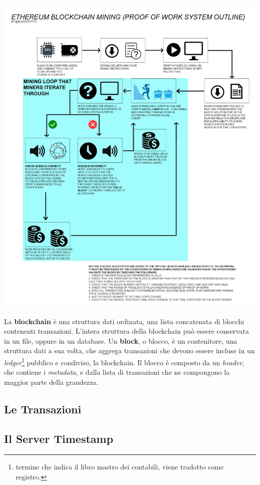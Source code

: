 \documentclass[12pt,a4paper,draft]{article}
\begin{document}
%
\begin{center}
    \includegraphics[width=\linewidth]{img/pow}
\end{center}
%
La \textbf{blockchain} è una struttura dati ordinata, una lista concatenata di blocchi contenenti transazioni.
L'intera struttura della blockchain può essere conservata in un file, oppure in un database.
Un \textbf{block}, o blocco, è un contenitore, una struttura dati a sua volta, che aggrega transazioni che devono essere incluse in un \textit{ledger}\footnote{termine che indica il libro mastro dei contabili, viene tradotto come registro.} pubblico e condiviso, la blockchain. 
Il blocco è composto da un \textit{header}, che contiene i \textit{metadata}, e dalla lista di transazioni che ne compongono la maggior parte della grandezza.
\subsection{Le Transazioni}
%
%
\subsection{Il Server Timestamp}
%
%
\end{document}
